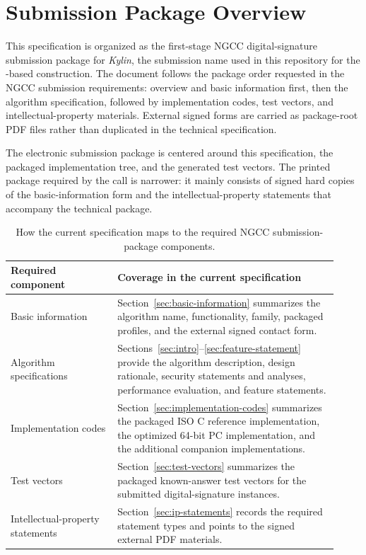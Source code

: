 \section{Submission Package Overview}
\label{sec:submission-overview}

This specification is organized as the first-stage NGCC digital-signature submission package for \emph{Kylin}, the submission name used in this repository for the \SPHINCSA-based construction. The document follows the package order requested in the NGCC submission requirements: overview and basic information first, then the algorithm specification, followed by implementation codes, test vectors, and intellectual-property materials. External signed forms are carried as package-root PDF files rather than duplicated in the technical specification.

The electronic submission package is centered around this specification, the packaged implementation tree, and the generated test vectors. The printed package required by the call is narrower: it mainly consists of signed hard copies of the basic-information form and the intellectual-property statements that accompany the technical package.

\begin{table}[htbp]
    \centering
    \caption{How the current specification maps to the required NGCC submission-package components.}
    \label{tab:package-components}
    \begin{tabular}{p{0.30\linewidth}p{0.62\linewidth}}
    \toprule
    Required component & Coverage in the current specification \\ \midrule
    Basic information & Section~\ref{sec:basic-information} summarizes the algorithm name, functionality, family, packaged profiles, and the external signed contact form. \\
    Algorithm specifications & Sections~\ref{sec:intro}--\ref{sec:feature-statement} provide the algorithm description, design rationale, security statements and analyses, performance evaluation, and feature statements. \\
    Implementation codes & Section~\ref{sec:implementation-codes} summarizes the packaged ISO C reference implementation, the optimized 64-bit PC implementation, and the additional companion implementations. \\
    Test vectors & Section~\ref{sec:test-vectors} summarizes the packaged known-answer test vectors for the submitted digital-signature instances. \\
    Intellectual-property statements & Section~\ref{sec:ip-statements} records the required statement types and points to the signed external PDF materials. \\
    \bottomrule
    \end{tabular}
\end{table}

